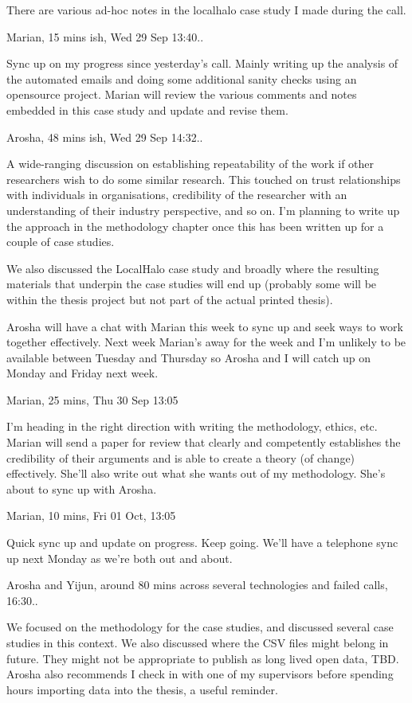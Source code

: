 There are various ad-hoc notes in the localhalo case study I made during the call.

\dotfill
Marian, 15 mins ish, Wed 29 Sep 13:40..

Sync up on my progress since yesterday's call. Mainly writing up the analysis of the automated emails and doing some additional sanity checks using an opensource project. Marian will review the various comments and notes embedded in this case study and update and revise them.

\dotfill
Arosha, 48 mins ish, Wed 29 Sep 14:32..

A wide-ranging discussion on establishing repeatability of the work if other researchers wish to do some similar research. This touched on trust relationships with individuals in organisations, credibility of the researcher with an understanding of their industry perspective, and so on. I'm planning to write up the approach in the methodology chapter once this has been written up for a couple of case studies.

We also discussed the LocalHalo case study and broadly where the resulting materials that underpin the case studies will end up (probably some will be within the thesis project but not part of the actual printed thesis).

Arosha will have a chat with Marian this week to sync up and seek ways to work together effectively. Next week Marian's away for the week and I'm unlikely to be available between Tuesday and Thursday so Arosha and I will catch up on Monday and Friday next week. 

\dotfill
Marian, 25 mins, Thu 30 Sep 13:05

I'm heading in the right direction with writing the methodology, ethics, etc. Marian will send a paper for review that clearly and competently establishes the credibility of their arguments and is able to create a theory (of change) effectively. She'll also write out what she wants out of my methodology. She's about to sync up with Arosha. 

\dotfill
Marian, 10 mins, Fri 01 Oct, 13:05

Quick sync up and update on progress. Keep going. We'll have a telephone sync up next Monday as we're both out and about.

\dotfill
Arosha and Yijun, around 80 mins across several technologies and failed calls, 16:30..

We focused on the methodology for the case studies, and discussed several case studies in this context. We also discussed where the CSV files might belong in future. They might not be appropriate to publish as long lived open data, TBD. Arosha also recommends I check in with one of my supervisors before spending hours importing data into the thesis, a useful reminder. 

